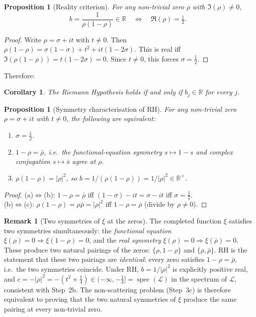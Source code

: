 \documentclass[12pt]{article}
\theoremstyle{plain}
\newtheorem{proposition}[theorem]{Proposition}
\newtheorem{corollary}[theorem]{Corollary}
\theoremstyle{definition}
\newtheorem{remark}[theorem]{Remark}
\newcommand{\R}{\mathbb{R}}
\begin{document}
\begin{proposition}[Reality criterion]\label{prop:reality}
For any non-trivial zero $\rho$ with $\Im(\rho)\ne 0$,
\[
  b = \frac{1}{\rho(1-\rho)}\in\R
  \quad\Longleftrightarrow\quad
  \Re(\rho)=\tfrac12.
\]
\end{proposition}

\begin{proof}
Write $\rho=\sigma+it$ with $t\ne0$.  Then
$\rho(1-\rho)=\sigma(1-\sigma)+t^2 + it(1-2\sigma)$.
This is real iff $\Im(\rho(1-\rho))=t(1-2\sigma)=0$.
Since $t\ne0$, this forces $\sigma=\tfrac12$.
\end{proof}

\noindent Therefore:

\begin{corollary}\label{cor:RH_equiv}
The Riemann Hypothesis holds if and only if $b_j\in\R$ for every $j$.
\end{corollary}

\begin{proposition}[Symmetry characterisation of RH]\label{prop:symmetry_char}
For any non-trivial zero $\rho=\sigma+it$ with $t\ne0$, the following are
equivalent:
\begin{enumerate}
\item[\textup{(a)}] $\sigma=\tfrac12$\textup{.}
\item[\textup{(b)}] $1-\rho=\bar\rho$\textup{,} i.e.\ the functional-equation
  symmetry $s\mapsto1-s$ and complex conjugation $s\mapsto\bar s$ agree at
  $\rho$.
\item[\textup{(c)}] $\rho(1-\rho)=|\rho|^2$\textup{,} so
  $b=1/(\rho(1-\rho))=1/|\rho|^2\in\R^+$.
\end{enumerate}
\end{proposition}

\begin{proof}
(a)$\Leftrightarrow$(b): $1-\rho=\bar\rho$ iff $(1-\sigma)-it=\sigma-it$
iff $\sigma=\tfrac12$.\\
(b)$\Leftrightarrow$(c): $\rho(1-\rho)=\rho\bar\rho=|\rho|^2$ iff
$1-\rho=\bar\rho$ (divide by $\rho\ne0$).
\end{proof}

\begin{remark}[Two symmetries of $\xi$ at the zeros]
The completed function $\xi$ satisfies two symmetries simultaneously:
the \emph{functional equation} $\xi(\rho)=0\Rightarrow\xi(1-\rho)=0$,
and the \emph{real symmetry} $\xi(\rho)=0\Rightarrow\xi(\bar\rho)=0$.
These produce two natural pairings of the zeros: $\{\rho,1-\rho\}$ and
$\{\rho,\bar\rho\}$.
RH is the statement that these two pairings are \emph{identical}: every
zero satisfies $1-\rho=\bar\rho$, i.e.\ the two symmetries coincide.
Under RH, $b=1/|\rho|^2$ is explicitly positive real, and
$c=-|\rho|^2=-(t^2+\tfrac14)\in(-\infty,-\tfrac14]=\operatorname{spec}(\mathcal{L})$
in the spectrum of $\mathcal{L}$, consistent with Step~2b.
The non-scattering problem (Step~3c) is therefore equivalent to proving
that the two natural symmetries of $\xi$ produce the same pairing at every
non-trivial zero.
\end{remark}
\end{document}
